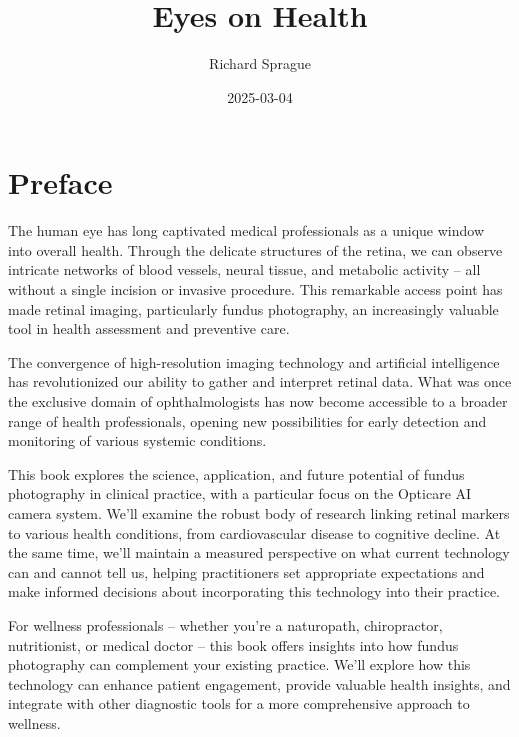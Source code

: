 \documentclass[
  Letterpaper,
]{scrbook}
\title{Eyes on Health}
\author{Richard Sprague}
\date{2025-03-04}
\renewcommand*\contentsname{Table of contents}
\newcommand\contentsname{Table of contents}
\begin{document}
\frontmatter
\maketitle

\renewcommand*\contentsname{Table of contents}
{
\setcounter{tocdepth}{2}
\tableofcontents
}

\mainmatter
{}

\chapter*{Preface}\label{preface}


The human eye has long captivated medical professionals as a unique
window into overall health. Through the delicate structures of the
retina, we can observe intricate networks of blood vessels, neural
tissue, and metabolic activity -- all without a single incision or
invasive procedure. This remarkable access point has made retinal
imaging, particularly fundus photography, an increasingly valuable tool
in health assessment and preventive care.

The convergence of high-resolution imaging technology and artificial
intelligence has revolutionized our ability to gather and interpret
retinal data. What was once the exclusive domain of ophthalmologists has
now become accessible to a broader range of health professionals,
opening new possibilities for early detection and monitoring of various
systemic conditions.

This book explores the science, application, and future potential of
fundus photography in clinical practice, with a particular focus on the
Opticare AI camera system. We'll examine the robust body of research
linking retinal markers to various health conditions, from
cardiovascular disease to cognitive decline. At the same time, we'll
maintain a measured perspective on what current technology can and
cannot tell us, helping practitioners set appropriate expectations and
make informed decisions about incorporating this technology into their
practice.

For wellness professionals -- whether you're a naturopath, chiropractor,
nutritionist, or medical doctor -- this book offers insights into how
fundus photography can complement your existing practice. We'll explore
how this technology can enhance patient engagement, provide valuable
health insights, and integrate with other diagnostic tools for a more
comprehensive approach to wellness.
\end{document}
